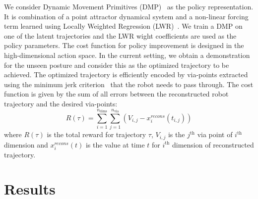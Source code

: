 \documentclass{article}
\begin{document}
We consider Dynamic Movement Primitives (DMP)~\cite{dmp} as the policy representation. It is combination of a point attractor dynamical system and a non-linear forcing term learned using Locally Weighted Regression (LWR)~\cite{lwr}.
We train a DMP on one of the latent trajectories and the LWR wight coefficients are used as the policy parameters. The cost function for policy improvement is designed in the high-dimensional action space. In the current setting, we obtain a demonstration for the unseen posture and consider this as the optimized trajectory to be achieved. The optimized trajectory is efficiently encoded by via-points extracted using the minimum jerk criterion~\cite{via} that the robot needs to pass through. The cost function is given by the sum of all errors between the reconstructed robot trajectory and the desired via-points:
\begin{equation}
  R(\tau) = \sum_{i = 1}^{n_{\text{dims}}} \sum_{j = 1}^{n_{\text{via}}} (V_{i,j} - x^{recons}_i(t_{i,j}))
\end{equation}
where $R(\tau)$ is the total reward for trajectory $\tau$, $V_{i,j}$ is the $j^{\text{th}}$ via point of $i^{\text{th}}$ dimension and $x^{recons}_i(t)$ is the value at time $t$ for $i^{\text{th}}$ dimension of reconstructed trajectory.
\section{Results}
\label{section:results}
\end{document}
